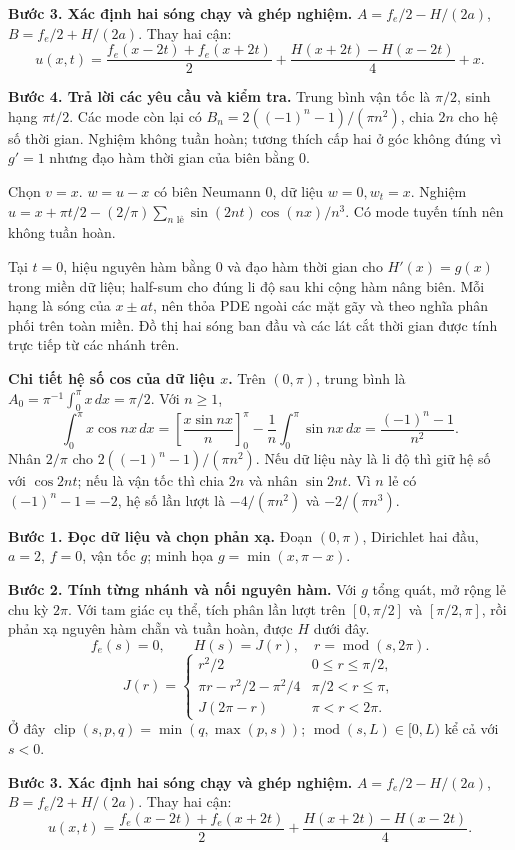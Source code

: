 \textbf{Bước 3. Xác định hai sóng chạy và ghép nghiệm.} $A=f_e/2-H/(2a)$, $B=f_e/2+H/(2a)$. Thay hai cận:
\[u(x,t)=\frac{f_e(x-2t)+f_e(x+2t)}2+\frac{H(x+2t)-H(x-2t)}{4}+x.\]

\textbf{Bước 4. Trả lời các yêu cầu và kiểm tra.} Trung bình vận tốc là $\pi/2$, sinh hạng $\pi t/2$. Các mode còn lại có $B_n=2(( -1)^n-1)/(\pi n^2)$, chia $2n$ cho hệ số thời gian. Nghiệm không tuần hoàn; tương thích cấp hai ở góc không đúng vì $g'=1$ nhưng đạo hàm thời gian của biên bằng $0$.

Chọn $v=x$. $w=u-x$ có biên Neumann 0, dữ liệu $w=0,w_t=x$. Nghiệm $u=x+\pi t/2-(2/\pi)\sum_{n\text{ lẻ}}\sin(2nt)\cos(nx)/n^3$. Có mode tuyến tính nên không tuần hoàn.

Tại $t=0$, hiệu nguyên hàm bằng $0$ và đạo hàm thời gian cho $H'(x)=g(x)$ trong miền dữ liệu; half-sum cho đúng li độ sau khi cộng hàm nâng biên. Mỗi hạng là sóng của $x\pm at$, nên thỏa PDE ngoài các mặt gãy và theo nghĩa phân phối trên toàn miền. Đồ thị hai sóng ban đầu và các lát cắt thời gian được tính trực tiếp từ các nhánh trên.

\textbf{Chi tiết hệ số cos của dữ liệu $x$.} Trên $(0,\pi)$, trung bình là $A_0=\pi^{-1}\int_0^\pi x\,dx=\pi/2$. Với $n\ge1$,
\[\int_0^\pi x\cos nx\,dx=\left[\frac{x\sin nx}{n}\right]_0^\pi-\frac1n\int_0^\pi\sin nx\,dx
=\frac{(-1)^n-1}{n^2}.\]
Nhân $2/\pi$ cho $2((-1)^n-1)/(\pi n^2)$. Nếu dữ liệu này là li độ thì giữ hệ số với $\cos2nt$; nếu là vận tốc thì chia $2n$ và nhân $\sin2nt$. Vì $n$ lẻ có $(-1)^n-1=-2$, hệ số lần lượt là $-4/(\pi n^2)$ và $-2/(\pi n^3)$.

\textbf{Bước 1. Đọc dữ liệu và chọn phản xạ.} Đoạn $(0,\pi)$, Dirichlet hai đầu, $a=2$, $f=0$, vận tốc $g$; minh họa $g=\min(x,\pi-x)$.

\textbf{Bước 2. Tính từng nhánh và nối nguyên hàm.} Với $g$ tổng quát, mở rộng lẻ chu kỳ $2\pi$. Với tam giác cụ thể, tích phân lần lượt trên $[0,\pi/2]$ và $[\pi/2,\pi]$, rồi phản xạ nguyên hàm chẵn và tuần hoàn, được $H$ dưới đây.
\[f_e(s)=0,\qquad H(s)=J(r),\quad r=\operatorname{mod}(s,2\pi).\]
\[J(r)=\begin{cases}r^2/2&0\le r\le\pi/2,\\\pi r-r^2/2-\pi^2/4&\pi/2<r\le\pi,\\J(2\pi-r)&\pi<r<2\pi.\end{cases}\]
Ở đây $\operatorname{clip}(s,p,q)=\min(q,\max(p,s))$; $\operatorname{mod}(s,L)\in[0,L)$ kể cả với $s<0$.

\textbf{Bước 3. Xác định hai sóng chạy và ghép nghiệm.} $A=f_e/2-H/(2a)$, $B=f_e/2+H/(2a)$. Thay hai cận:
\[u(x,t)=\frac{f_e(x-2t)+f_e(x+2t)}2+\frac{H(x+2t)-H(x-2t)}{4}.\]

